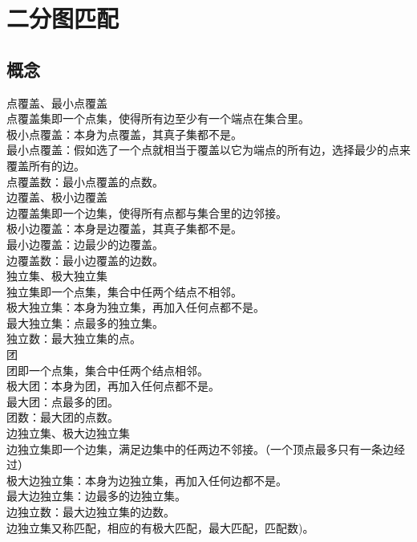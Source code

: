 


\section{二分图匹配}

\subsection{概念}

点覆盖、最小点覆盖 \\
点覆盖集即一个点集，使得所有边至少有一个端点在集合里。 \\
极小点覆盖：本身为点覆盖，其真子集都不是。\\
最小点覆盖：假如选了一个点就相当于覆盖以它为端点的所有边，选择最少的点来覆盖所有的边。 \\
点覆盖数：最小点覆盖的点数。 \\

边覆盖、极小边覆盖 \\
边覆盖集即一个边集，使得所有点都与集合里的边邻接。 \\
极小边覆盖：本身是边覆盖，其真子集都不是。 \\
最小边覆盖：边最少的边覆盖。 \\
边覆盖数：最小边覆盖的边数。 \\

独立集、极大独立集 \\
独立集即一个点集，集合中任两个结点不相邻。 \\
极大独立集：本身为独立集，再加入任何点都不是。 \\
最大独立集：点最多的独立集。 \\
独立数：最大独立集的点。 \\

团 \\
团即一个点集，集合中任两个结点相邻。 \\
极大团：本身为团，再加入任何点都不是。 \\
最大团：点最多的团。 \\
团数：最大团的点数。 \\

边独立集、极大边独立集 \\
边独立集即一个边集，满足边集中的任两边不邻接。（一个顶点最多只有一条边经过） \\
极大边独立集：本身为边独立集，再加入任何边都不是。 \\
最大边独立集：边最多的边独立集。 \\
边独立数：最大边独立集的边数。 \\
边独立集又称匹配，相应的有极大匹配，最大匹配，匹配数)。 \\

